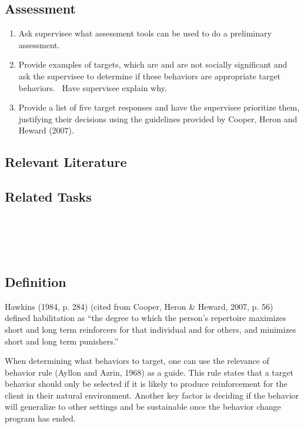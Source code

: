 \subsection{Assessment}
\begin{enumerate}
\item Ask supervisee what assessment tools can be used to do a preliminary assessment. 
\item Provide examples of targets, which are and are not socially significant and ask the supervisee to determine if these behaviors are appropriate target behaviors.  Have supervisee explain why. 
\item Provide a list of five target responses and have the supervisee prioritize them, justifying their decisions using the guidelines provided by Cooper, Heron and Heward (2007).
\end{enumerate}
%
\subsection{Relevant Literature}
\begin{refsection}
\nocite{bailey2013ethics,
        cooper2007applied,
        hawkins1979functions,
        linehan1977issues,
        van1979social}
\printbibliography[heading=none]
\end{refsection}
%
\subsection{Related Tasks} 
\fouriOne{}\\
\fouriTwo{}\\
\fourjOne{}\\
%
\clearpage \section[\fouriSix{}]{\fouriSix{}%
              }
\subsection{Definition}
Hawkins (1984, p. 284) (cited from Cooper, Heron \& Heward, 2007, p. 56) defined habilitation as ``the degree to which the person's repertoire maximizes short and long term reinforcers for that individual and for others, and minimizes short and long term punishers.''

When determining what behaviors to target, one can use the relevance of behavior rule (Ayllon and Azrin, 1968) as a guide. This rule states that a target behavior should only be selected if it is likely to produce reinforcement for the client in their natural environment. Another key factor is deciding if the behavior will generalize to other settings and be sustainable once the behavior change program has ended. 

